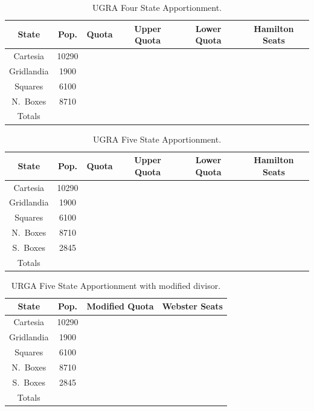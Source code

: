 	\begin{small}
		\begin{table}[!ht]
			\centering
			\renewcommand{\arraystretch}{1.5}
			\begin{tabular}{|c | c | c | c | c | c |}
				\hline
				State & Pop. & Quota & Upper Quota & Lower Quota & Hamilton Seats \\
				\hline
				Cartesia & 10290 & \phantom{Upper Quota} & & & \\
				\hline
				Gridlandia & 1900 & \phantom{ 7.03 } & & & \\
				\hline
				Squares & 6100 & \phantom{22.59} & & & \\
				\hline
				N.\ Boxes & 8710 & \phantom{32.26} & & & \\
				\hline
				Totals & & & & & \\
				\hline
			\end{tabular}
			\caption{UGRA Four State Apportionment.}
			\label{tab:four_states}
		\end{table}

		\begin{table}[!ht]
			\centering
			\renewcommand{\arraystretch}{1.5}
			\begin{tabular}{|c | c | c | c | c | c |}
				\hline
				State & Pop. & Quota & Upper Quota & Lower Quota & Hamilton Seats \\
				\hline
				Cartesia & 10290 & \phantom{Upper Quota} & & & \\
				\hline
				Gridlandia & 1900 & \phantom{ 7.03 } & & & \\
				\hline
				Squares & 6100 & \phantom{22.59} & & & \\
				\hline
				N.\ Boxes & 8710 & \phantom{32.26} & & & \\
				\hline
				S.\ Boxes & 2845 & \phantom{10.48}  & & & \\
				\hline
				Totals & & & & & \\
				\hline
			\end{tabular}
			\caption{UGRA Five State Apportionment.}
			\label{tab:five_states}
		\end{table}

		\begin{table}[!ht]
			\centering
			\renewcommand{\arraystretch}{1.5}
			\begin{tabular}{|c | c | c | c |}
				\hline
				State & Pop. & Modified Quota & Webster Seats \\
				\hline
				Cartesia & 10290 & \phantom{ 38.11 / 37.92} &\\
				\hline
				Gridlandia & 1900 & \phantom{ 7.03/7.00 } & \\
				\hline
				Squares & 6100 & \phantom{22.59/22.48} &  \\
				\hline
				N.\ Boxes & 8710 & \phantom{32.26/32.10} & \\
				\hline
				S.\ Boxes & 2845 & \phantom{10.48}  & \\
				\hline
				Totals & & & \\
				\hline
				\end{tabular}
			\caption{URGA Five State Apportionment with modified divisor.}
			\label{tab:five_states_with_modified_divisor}
		\end{table}
	\end{small}

